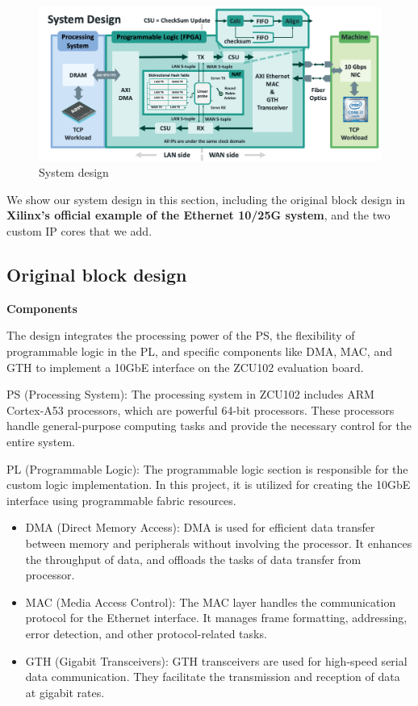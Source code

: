 \begin{figure}[h]
    \centering
    \includegraphics[width=\linewidth]{images/design.png}
    \caption{System design}
\end{figure}
    We show our system design in this section, including the original block design in \textbf{Xilinx's official example of the Ethernet 10/25G system}, and the two custom IP cores that we add. 

\subsection{Original block design}

    \textbf{Components}\

    The design integrates the processing power of the PS, the flexibility of programmable logic in the PL, and specific components like DMA, MAC, and GTH to implement a 10GbE interface on the ZCU102 evaluation board.

    PS (Processing System): The processing system in ZCU102 includes ARM Cortex-A53 processors, which are powerful 64-bit processors. These processors handle general-purpose computing tasks and provide the necessary control for the entire system.
    
    PL (Programmable Logic): The programmable logic section is responsible for the custom logic implementation. In this project, it is utilized for creating the 10GbE interface using programmable fabric resources.

    \begin{itemize}
    \item {DMA (Direct Memory Access)}: DMA is used for efficient data transfer between memory and peripherals without involving the processor. It enhances the throughput of data, and offloads the tasks of data transfer from processor.
    \item {MAC (Media Access Control)}: The MAC layer handles the communication protocol for the Ethernet interface. It manages frame formatting, addressing, error detection, and other protocol-related tasks.
    \item {GTH (Gigabit Transceivers)}: GTH transceivers are used for high-speed serial data communication. They facilitate the transmission and reception of data at gigabit rates.
    \end{itemize}

